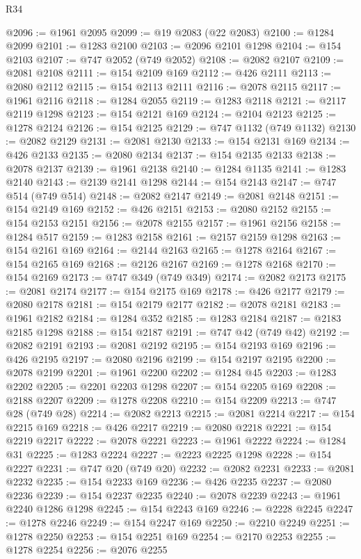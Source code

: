 \begin{lexlean}{R34}
\begin{coremodule}
@2096 := @1961 @2095
@2099 := @19 @2083 (@22 @2083)
@2100 := @1284 @2099
@2101 := @1283 @2100
@2103 := @2096 @2101 @1298
@2104 := @154 @2103
@2107 := @747 @2052 (@749 @2052)
@2108 := @2082 @2107
@2109 := @2081 @2108
@2111 := @154 @2109 @169
@2112 := @426 @2111
@2113 := @2080 @2112
@2115 := @154 @2113 @2111
@2116 := @2078 @2115
@2117 := @1961 @2116
@2118 := @1284 @2055
@2119 := @1283 @2118
@2121 := @2117 @2119 @1298
@2123 := @154 @2121 @169
@2124 := @2104 @2123
@2125 := @1278 @2124
@2126 := @154 @2125
@2129 := @747 @1132 (@749 @1132)
@2130 := @2082 @2129
@2131 := @2081 @2130
@2133 := @154 @2131 @169
@2134 := @426 @2133
@2135 := @2080 @2134
@2137 := @154 @2135 @2133
@2138 := @2078 @2137
@2139 := @1961 @2138
@2140 := @1284 @1135
@2141 := @1283 @2140
@2143 := @2139 @2141 @1298
@2144 := @154 @2143
@2147 := @747 @514 (@749 @514)
@2148 := @2082 @2147
@2149 := @2081 @2148
@2151 := @154 @2149 @169
@2152 := @426 @2151
@2153 := @2080 @2152
@2155 := @154 @2153 @2151
@2156 := @2078 @2155
@2157 := @1961 @2156
@2158 := @1284 @517
@2159 := @1283 @2158
@2161 := @2157 @2159 @1298
@2163 := @154 @2161 @169
@2164 := @2144 @2163
@2165 := @1278 @2164
@2167 := @154 @2165 @169
@2168 := @2126 @2167
@2169 := @1278 @2168
@2170 := @154 @2169
@2173 := @747 @349 (@749 @349)
@2174 := @2082 @2173
@2175 := @2081 @2174
@2177 := @154 @2175 @169
@2178 := @426 @2177
@2179 := @2080 @2178
@2181 := @154 @2179 @2177
@2182 := @2078 @2181
@2183 := @1961 @2182
@2184 := @1284 @352
@2185 := @1283 @2184
@2187 := @2183 @2185 @1298
@2188 := @154 @2187
@2191 := @747 @42 (@749 @42)
@2192 := @2082 @2191
@2193 := @2081 @2192
@2195 := @154 @2193 @169
@2196 := @426 @2195
@2197 := @2080 @2196
@2199 := @154 @2197 @2195
@2200 := @2078 @2199
@2201 := @1961 @2200
@2202 := @1284 @45
@2203 := @1283 @2202
@2205 := @2201 @2203 @1298
@2207 := @154 @2205 @169
@2208 := @2188 @2207
@2209 := @1278 @2208
@2210 := @154 @2209
@2213 := @747 @28 (@749 @28)
@2214 := @2082 @2213
@2215 := @2081 @2214
@2217 := @154 @2215 @169
@2218 := @426 @2217
@2219 := @2080 @2218
@2221 := @154 @2219 @2217
@2222 := @2078 @2221
@2223 := @1961 @2222
@2224 := @1284 @31
@2225 := @1283 @2224
@2227 := @2223 @2225 @1298
@2228 := @154 @2227
@2231 := @747 @20 (@749 @20)
@2232 := @2082 @2231
@2233 := @2081 @2232
@2235 := @154 @2233 @169
@2236 := @426 @2235
@2237 := @2080 @2236
@2239 := @154 @2237 @2235
@2240 := @2078 @2239
@2243 := @1961 @2240 @1286 @1298
@2245 := @154 @2243 @169
@2246 := @2228 @2245
@2247 := @1278 @2246
@2249 := @154 @2247 @169
@2250 := @2210 @2249
@2251 := @1278 @2250
@2253 := @154 @2251 @169
@2254 := @2170 @2253
@2255 := @1278 @2254
@2256 := @2076 @2255

\end{coremodule}
\end{lexlean}
